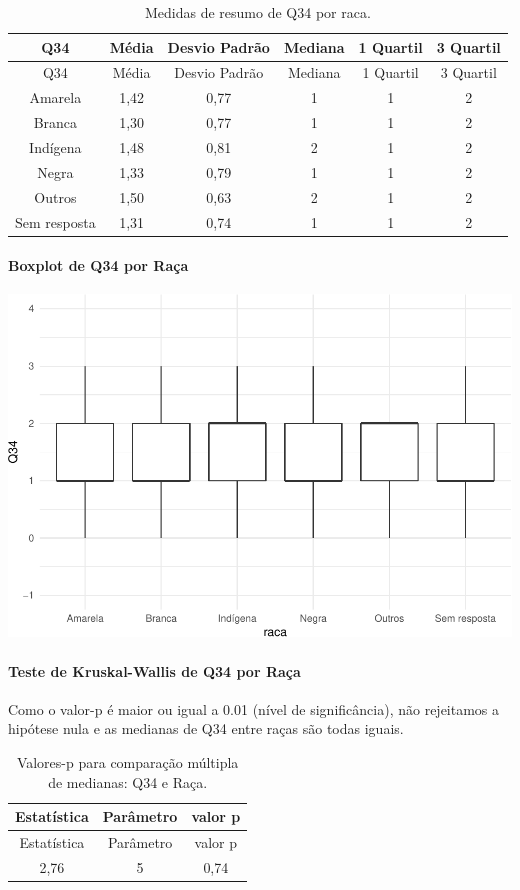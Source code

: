 \documentclass[]{article}
\let\oldparagraph\paragraph
\renewcommand{\paragraph}[1]{\oldparagraph{#1}\mbox{}}
\begin{document}
\begin{longtable}[]{@{}cccccc@{}}
\caption{\label{tab:unnamed-chunk-1226}Medidas de resumo de Q34 por raca.}\tabularnewline
\toprule
Q34 & Média & Desvio Padrão & Mediana & 1 Quartil & 3 Quartil\tabularnewline
\midrule
\endfirsthead
\toprule
Q34 & Média & Desvio Padrão & Mediana & 1 Quartil & 3 Quartil\tabularnewline
\midrule
\endhead
Amarela & 1,42 & 0,77 & 1 & 1 & 2\tabularnewline
Branca & 1,30 & 0,77 & 1 & 1 & 2\tabularnewline
Indígena & 1,48 & 0,81 & 2 & 1 & 2\tabularnewline
Negra & 1,33 & 0,79 & 1 & 1 & 2\tabularnewline
Outros & 1,50 & 0,63 & 2 & 1 & 2\tabularnewline
Sem resposta & 1,31 & 0,74 & 1 & 1 & 2\tabularnewline
\bottomrule
\end{longtable}

\hypertarget{boxplot-de-q34-por-rauxe7a}{%
\paragraph{Boxplot de Q34 por Raça}\label{boxplot-de-q34-por-rauxe7a}}

\begin{center}\includegraphics[width=0.75\linewidth]{relatorio_covid19_files/figure-latex/unnamed-chunk-1227-1} \end{center}

\hypertarget{teste-de-kruskal-wallis-de-q34-por-rauxe7a}{%
\paragraph{Teste de Kruskal-Wallis de Q34 por Raça}\label{teste-de-kruskal-wallis-de-q34-por-rauxe7a}}

Como o valor-p é maior ou igual a 0.01 (nível de significância), não rejeitamos a hipótese nula e as medianas de Q34 entre raças são todas iguais.

\begin{longtable}[]{@{}ccc@{}}
\caption{\label{tab:unnamed-chunk-1229}Valores-p para comparação múltipla de medianas: Q34 e Raça.}\tabularnewline
\toprule
Estatística & Parâmetro & valor p\tabularnewline
\midrule
\endfirsthead
\toprule
Estatística & Parâmetro & valor p\tabularnewline
\midrule
\endhead
2,76 & 5 & 0,74\tabularnewline
\bottomrule
\end{longtable}
\end{document}
